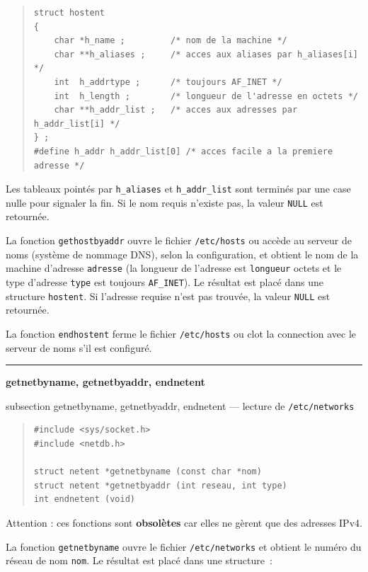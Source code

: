 \documentclass [twoside] {report}
\newcommand {\primitive} [1]
    {
	\phantomsection
	{\large \textbf {#1}}
	\addcontentsline {toc} {subsection} {#1}
    }
\newcommand {\separation}
    {
	\vspace {5mm}
	\nopagebreak
	\hrule
    }
\begin{document}
\begin {quote}
    \small
\begin {verbatim}
struct hostent
{
    char *h_name ;         /* nom de la machine */
    char **h_aliases ;     /* acces aux aliases par h_aliases[i] */
    int  h_addrtype ;      /* toujours AF_INET */
    int  h_length ;        /* longueur de l'adresse en octets */
    char **h_addr_list ;   /* acces aux adresses par h_addr_list[i] */
} ;
#define h_addr h_addr_list[0] /* acces facile a la premiere adresse */
\end{verbatim}
\end {quote}

Les tableaux pointés par \texttt {h\_aliases} et \texttt {h\_addr\_list} sont
terminés par une case nulle pour signaler la fin. Si le nom requis
n'existe pas, la valeur \texttt {NULL} est retournée.

La fonction \texttt {gethostbyaddr} ouvre le fichier \texttt {/etc/hosts} ou
accède au serveur de noms (système de nommage DNS), selon la
configuration, et obtient le nom de la machine d'adresse
\texttt {adresse} (la longueur de l'adresse est \texttt {longueur} octets et le
type d'adresse \texttt {type} est toujours \texttt {AF\_INET}). Le résultat
est placé dans une structure \texttt {hostent}. Si l'adresse requise
n'est pas trouvée, la valeur \texttt {NULL} est retournée.

La fonction \texttt {endhostent} ferme le fichier \texttt {/etc/hosts} ou clot
la connection avec le serveur de noms s'il est configuré.


\separation
\primitive {getnetbyname, getnetbyaddr,
endnetent} --- lecture de \texttt {/etc/networks}

\begin {quote}
\begin {verbatim}
#include <sys/socket.h>
#include <netdb.h>

struct netent *getnetbyname (const char *nom)
struct netent *getnetbyaddr (int reseau, int type)
int endnetent (void)
\end{verbatim}
\end {quote}

Attention : ces fonctions sont \textbf {obsolètes} car elles ne gèrent que
des adresses IPv4.

La fonction \texttt {getnetbyname} ouvre le fichier \texttt {/etc/networks} et
obtient le numéro du réseau de nom \texttt {nom}.  Le résultat est placé
dans une structure~:
\end{document}
